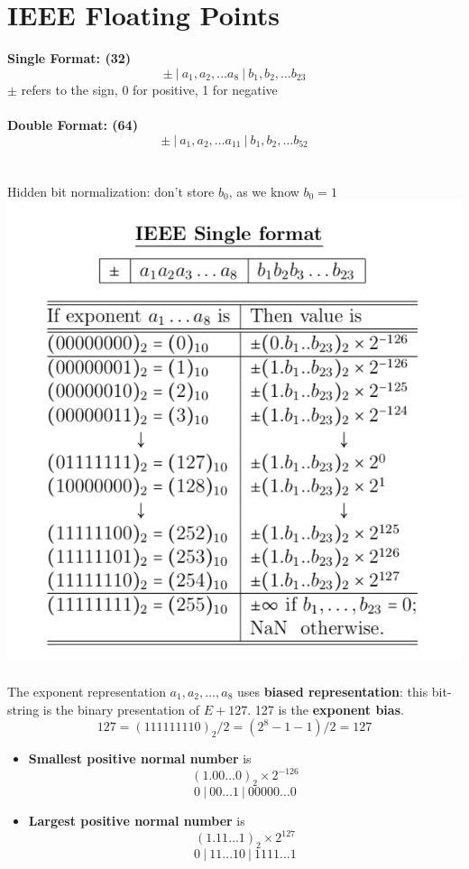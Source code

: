 \documentclass [9 pt]{article}
\theoremstyle{definition}
\begin{document}
\section*{IEEE Floating Points}
\textbf{Single Format: (32)}
$$ \pm \ | \ a_1, a_2, \ldots a_8 \ |\ b_1, b_2, \ldots b_{23}$$
$\pm$ refers to the sign, 0 for positive, 1 for negative
\\
\\
\textbf{Double Format: (64)}
$$ \pm \ | \ a_1, a_2, \ldots a_{11} \ |\ b_1, b_2, \ldots b_{52}$$
\\
\\
Hidden bit normalization: don't store $b_0$, as we know $b_0 = 1$\\
\includegraphics{1}
\\
\\
The exponent representation $a_1, a_2, \ldots, a_8$ uses \textbf{biased representation}: this bit-string is the binary presentation of $E + 127$. 127 is the \textbf{exponent bias}. 
$$127 = (111111110)_2 / 2 = (2^8 - 1 - 1) / 2 = 127$$
\begin{itemize}
	\item \textbf{Smallest positive normal number} is 
	$$  (1.00\ldots 0)_2 \times 2^{-126}  $$
	$$  0 \ | \ 0 0 \ldots 1 \ |\ 00000 \ldots 0  $$
	\item \textbf{Largest positive normal number} is 
	$$  (1.11\ldots 1)_2 \times 2^{127}  $$
	$$  0 \ | \ 1 1 \ldots 1 0 \ |\ 1111 \ldots 1  $$
\end{itemize}
\end{document}
